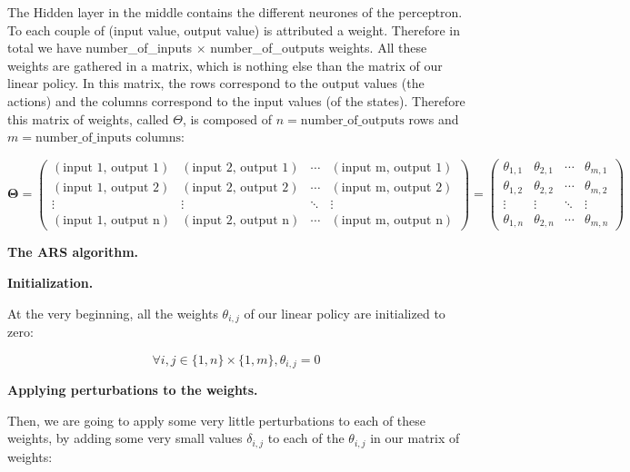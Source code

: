 \documentclass[]{book}
\begin{document}
The Hidden layer in the middle contains the different neurones of the perceptron. To each couple of (input value, output value) is attributed a weight. Therefore in total we have number\_of\_inputs \(\times\) number\_of\_outputs weights. All these weights are gathered in a matrix, which is nothing else than the matrix of our linear policy. In this matrix, the rows correspond to the output values (the actions) and the columns correspond to the input values (of the states). Therefore this matrix of weights, called \(\Theta\), is composed of \(n = \textrm{number\_of\_outputs}\) rows and \(m = \textrm{number\_of\_inputs columns}\):

\begin{equation*}
\boldsymbol{\Theta}
=
\begin{pmatrix}
(\textrm{input 1, output 1}) & (\textrm{input 2, output 1}) & \cdots & (\textrm{input m, output 1}) \\
(\textrm{input 1, output 2}) & (\textrm{input 2, output 2}) & \cdots & (\textrm{input m, output 2}) \\
\vdots & \vdots & \ddots & \vdots \\
(\textrm{input 1, output n}) & (\textrm{input 2, output n}) & \cdots & (\textrm{input m, output n})
\end{pmatrix}
=
\begin{pmatrix}
\theta_{1,1} & \theta_{2,1} & \cdots & \theta_{m,1} \\
\theta_{1,2} & \theta_{2,2} & \cdots & \theta_{m,2} \\
\vdots & \vdots & \ddots & \vdots \\
\theta_{1,n} & \theta_{2,n} & \cdots & \theta_{m,n}
\end{pmatrix}
\end{equation*}

\newpage

\textbf{The ARS algorithm.}

\textbf{Initialization.}

At the very beginning, all the weights \(\theta_{i,j}\) of our linear policy are initialized to zero:

\begin{equation*}
\forall i,j \in \{1,n\}\times\{1,m\}, \theta_{i,j} = 0
\end{equation*}

\textbf{Applying perturbations to the weights.}

Then, we are going to apply some very little perturbations to each of these weights, by adding some very small values \(\delta_{i,j}\) to each of the \(\theta_{i,j}\) in our matrix of weights:
\end{document}
